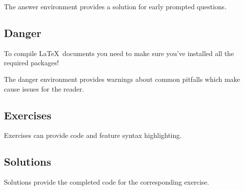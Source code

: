 \documentclass[12pt]{article}
\begin{document}
    The answer environment provides a solution for early prompted questions.

    \subsection{Danger}

    \begin{danger}
        To compile \LaTeX~documents you need to make sure you've installed all the required packages! 
    \end{danger}

    The danger environment provides warnings about common pitfalls which make cause issues for the reader.

    \subsection{Exercises}
    
    \begin{exercise}
        
    \end{exercise}
    Exercises can provide code and feature syntax highlighting.

    \subsection{Solutions}
    \begin{solution}
        
    \end{solution}

    Solutions provide the completed code for the corresponding exercise.
\end{document}
